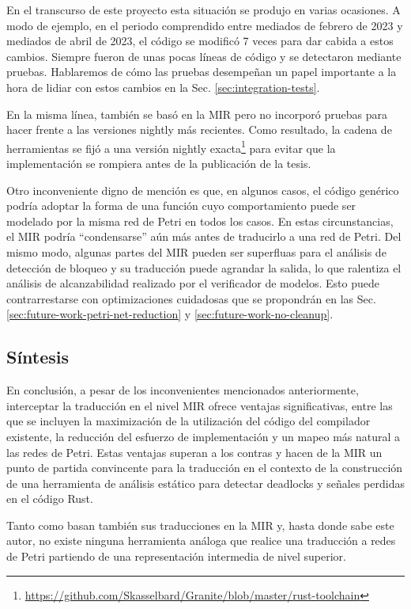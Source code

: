 En el transcurso de este proyecto esta situación se produjo en varias ocasiones. A
modo de ejemplo, en el periodo comprendido entre mediados de febrero de 2023 y mediados
de abril de 2023, el código se modificó 7 veces para dar cabida a estos cambios. Siempre
fueron de unas pocas líneas de código y se detectaron mediante pruebas. Hablaremos de cómo
las pruebas desempeñan un papel importante a la hora de lidiar con estos cambios en la
Sec. \ref{sec:integration-tests}.

En la misma línea, \cite{meyer2020} también se basó en la \acrshort{MIR} pero no incorporó pruebas para
hacer frente a las versiones nightly más recientes. Como resultado, la cadena de herramientas
se fijó a una versión nightly exacta\footnote{\url{https://github.com/Skasselbard/Granite/blob/master/rust-toolchain}}
para evitar que la implementación se rompiera antes de la publicación de la tesis.

Otro inconveniente digno de mención es que, en algunos casos, el código genérico podría
adoptar la forma de una función cuyo comportamiento puede ser modelado por la misma red de
Petri en todos los casos. En estas circunstancias, el \acrshort{MIR} podría ``condensarse'' aún más antes de
traducirlo a una red de Petri. Del mismo modo, algunas partes del MIR pueden ser superfluas
para el análisis de detección de bloqueo y su traducción puede agrandar la salida, lo que
ralentiza el análisis de alcanzabilidad realizado por el verificador de modelos. Esto puede
contrarrestarse con optimizaciones cuidadosas
que se propondrán en las Sec. \ref{sec:future-work-petri-net-reduction} y \ref{sec:future-work-no-cleanup}.

\subsection{Síntesis}

En conclusión, a pesar de los inconvenientes mencionados anteriormente, interceptar la
traducción en el nivel \acrshort{MIR} ofrece ventajas significativas, entre las que se incluyen la
maximización de la utilización del código del compilador existente, la reducción del esfuerzo
de implementación y un mapeo más natural a las redes de Petri. Estas ventajas superan a los
contras y hacen de la \acrshort{MIR} un punto de partida convincente para la traducción en el contexto
de la construcción de una herramienta de análisis estático para detectar deadlocks y señales
perdidas en el código Rust.

Tanto \cite{meyer2020} como \cite{zhang2022deadlocks} basan también sus traducciones en la \acrshort{MIR} y,
hasta donde sabe este autor, no existe ninguna herramienta análoga que realice una traducción
a redes de Petri partiendo de una representación intermedia de nivel superior.